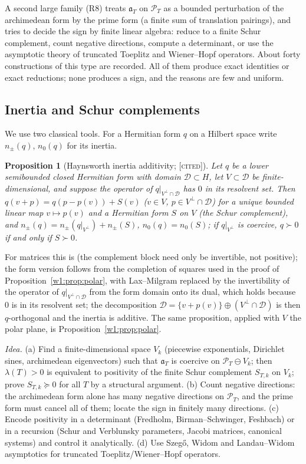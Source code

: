 \documentclass[11pt]{amsart}
\newtheorem{proposition}[theorem]{Proposition}
\theoremstyle{definition}
\theoremstyle{remark}
\numberwithin{equation}{section}
\newcommand{\PT}{\mathcal{P}_T}                        %
\newcommand{\aT}{\mathfrak{a}_T}                       %
\newcommand{\lam}{\lambda(T)}                          %
\newcommand{\stag}[1]{\textsc{[#1]}}
\newcommand{\CITED}{\stag{cited}}
\newcommand{\entry}[1]{\par\smallskip\noindent\textit{#1.}\enspace}
\begin{document}
A second large family (R8) treats $\aT$ on $\PT$ as a bounded perturbation of the archimedean form by the prime form (a finite sum
of translation pairings), and tries to decide the sign by finite linear algebra: reduce to a finite Schur complement, count negative
directions, compute a determinant, or use the asymptotic theory of truncated Toeplitz and Wiener--Hopf operators. About
forty constructions of this type are recorded. All of them produce exact identities or exact reductions; none produces a
sign, and the reasons are few and uniform.

\subsection{Inertia and Schur complements}\label{w5:fam:R8}

We use two classical tools. For a Hermitian form $q$ on a Hilbert space write $n_\pm(q)$, $n_0(q)$ for its inertia.

\begin{proposition}[Haynsworth inertia additivity; \CITED]\label{w5:prop:haynsworth}
Let $q$ be a lower semibounded closed Hermitian form with domain $\mathcal D\subset H$, let $V\subset\mathcal D$ be
finite-dimensional, and suppose the operator of $q|_{V^\perp\cap\mathcal D}$ has $0$ in its resolvent set. Then
$q(v+p)=q(p-p(v))+S(v)$ ($v\in V$, $p\in V^\perp\cap\mathcal D$) for a unique bounded linear map $v\mapsto p(v)$ and a
Hermitian form $S$ on $V$ (the Schur complement), and $n_\pm(q)=n_\pm(q|_{V^\perp})+n_\pm(S)$, $n_0(q)=n_0(S)$; if
$q|_{V^\perp}$ is coercive, $q\succ0$ if and only if $S\succ0$.
\end{proposition}

For matrices this is \cite{Haynsworth1968} (the complement block need only be invertible, not positive); the form version follows from the completion of squares used in the proof of
Proposition~\ref{w1:prop:polar}, with Lax--Milgram replaced by the invertibility of the operator of
$q|_{V^\perp\cap\mathcal D}$ from the form domain onto its dual, which holds because $0$ is in its resolvent set; the
decomposition $\mathcal D=\{v+p(v)\}\oplus(V^\perp\cap\mathcal D)$ is then $q$-orthogonal and the inertia is additive. The same proposition, applied with $V$ the polar plane, is Proposition~\ref{w1:prop:polar}.

\entry{Idea} (a) Find a finite-dimensional space $V_k$ (piecewise exponentials, Dirichlet sines, archimedean eigenvectors)
such that $\aT$ is coercive on $\PT\ominus V_k$; then $\lam>0$ is equivalent to positivity of the finite Schur complement
$S_{T,k}$ on $V_k$; prove $S_{T,k}\succeq0$ for all $T$ by a structural argument. (b) Count negative directions: the
archimedean form alone has many negative directions on $\PT$, and the prime form must cancel all of them; locate the sign
in finitely many directions. (c) Encode positivity in a determinant (Fredholm, Birman--Schwinger, Feshbach) or in a
recursion (Schur and Verblunsky parameters, Jacobi matrices, canonical systems) and control it analytically.
(d) Use Szeg\H{o}, Widom and Landau--Widom asymptotics for truncated Toeplitz/Wiener--Hopf operators.
\end{document}
